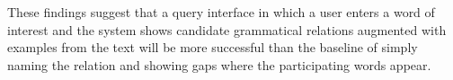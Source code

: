 These findings suggest that a query interface in which a user enters a word of interest and the system shows candidate grammatical relations augmented with examples from the text will be more successful than the baseline of simply naming the relation and showing gaps where the participating words appear.

%
%
%



